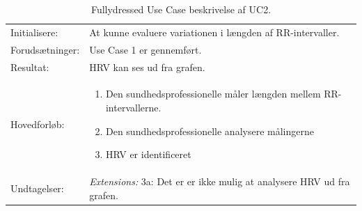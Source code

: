 \begin{table}[H]
\begin{tabularx}{\textwidth}{l X}
     Initialisere:          & 	At kunne evaluere variationen i længden af RR-intervaller.
		 \\ \addlinespace[1mm]                                                                                                                                                                                                                                                                                                             
     Forudsætninger:        & 	Use Case 1 er gennemført.                                                                                                                                                                                                                                                                                                                                                                                                                                                                                                                                                                           \\ \addlinespace[1mm]                                                                                                                                                       
     Resultat:              & 	HRV kan ses ud fra grafen.                                                                                                                                                                                                                                                                                                                                                                                                                                                                                                                          \\ \midrule \addlinespace[1mm]                                                                                                                                                       
     Hovedforløb:           &  \begin{enumerate}
     						   \item Den sundhedsprofessionelle måler længden mellem RR-intervallerne.
     						   \item Den sundhedsprofessionelle analysere målingerne
     						   \item HRV er identificeret
\newline						[Extensions 3a: HRV er ikke identificerbart]
     						   \end{enumerate}
\\ \midrule 
 	Undtagelser:           & \textit{Extensions:}
\newline					 3a: Det er er ikke mulig at analysere HRV ud fra grafen. 
\\ \bottomrule
    \end{tabularx}
    \caption {Fullydressed Use Case beskrivelse af UC2.}
    \label{tab:UC2}
\end{table}

